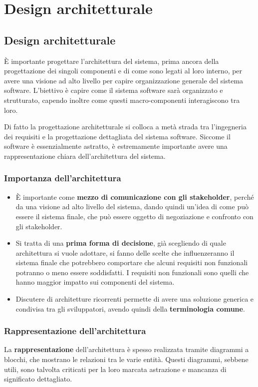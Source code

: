\chapter{Design architetturale}
\section{Design architetturale}
È importante progettare l'architettura del sistema, prima ancora della progettazione 
dei singoli componenti e di come sono legati al loro interno, per avere una visione ad 
alto livello per capire organizzazione generale del sistema software.
L'biettivo è capire come il sistema software sarà organizzato e strutturato, 
capendo inoltre come questi macro-componenti interagiscono tra loro.

Di fatto la progettazione architetturale si colloca a metà strada tra l'ingegneria dei
requisiti e la progettazione dettagliata del sistema software. Siccome il software è 
essenzialmente astratto, è estremamente importante avere una rappresentazione chiara
dell'architettura del sistema.
\subsection{Importanza dell'architettura}
\begin{itemize}
    \item È importante come \textbf{mezzo di comunicazione con gli stakeholder}, perché da una visione
    ad alto livello del sistema, dando quindi un'idea di come può essere il sistema finale, che 
    può essere oggetto di negoziazione e confronto con gli stakeholder. 
    
    \item Si tratta di una \textbf{prima forma di decisione}, già scegliendo di quale architettura
    si vuole
    adottare, si fanno delle scelte che influenzeranno il sistema finale che potrebbero comportare 
    che alcuni requisiti non funzionali potranno o meno essere soddisfatti. I requisiti non funzionali
    sono quelli che hanno maggior impatto sui componenti del sistema.
    \item Discutere di architetture ricorrenti permette di avere una soluzione generica e condivisa 
    tra gli sviluppatori, avendo quindi della \textbf{terminologia comune}.
\end{itemize}
\subsection{Rappresentazione dell'architettura}
La \textbf{rappresentazione} dell'architettura è spesso realizzata tramite diagrammi a blocchi,
che mostrano le relazioni tra le varie entità. Questi diagrammi, sebbene utili, sono
talvolta criticati per la loro marcata astrazione e mancanza di significato dettagliato.

